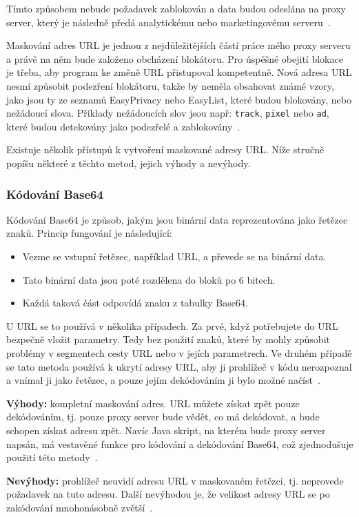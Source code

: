 Tímto způsobem nebude požadavek zablokován a data budou odeslána na proxy server, který je následně předá analytickému nebo marketingovému serveru~\cite{endpoint}.

\bigskip

Maskování adres URL je jednou z nejdůležitějších částí práce mého proxy serveru a právě na něm bude založeno obcházení blokátoru. Pro úspěšné obejití blokace je třeba, aby program ke změně URL přistupoval kompetentně. Nová adresa URL nesmí způsobit podezření blokátoru, takže by neměla obsahovat známé vzory, jako jsou ty ze seznamů EasyPrivacy nebo EasyList, které budou blokovány, nebo nežádoucí slova. Příklady nežádoucích slov jsou např: \texttt{track}, \texttt{pixel} nebo \texttt{ad}, které budou detekovány jako podezřelé a zablokovány~\cite{ad}. 

Existuje několik přístupů k vytvoření maskované adresy URL. Níže stručně popíšu některé z těchto metod, jejich výhody a nevýhody.

\subsubsection{Kódování Base64}
Kódování Base64 je způsob, jakým jsou binární data reprezentována jako řetězec znaků. Princip fungování je následující:
\bigskip
\begin{itemize}
  \item{Vezme se vstupní řetězec, například URL, a převede se na binární data.}
  \item{Tato binární data jsou poté rozdělena do bloků po 6 bitech.}
  \item{Každá taková část odpovídá znaku z tabulky Base64.}
\end{itemize}
U URL se to používá v několika případech. Za prvé, když potřebujete do URL bezpečně vložit parametry. Tedy bez použití znaků, které by mohly způsobit problémy v segmentech cesty URL nebo v jejích parametrech. Ve druhém případě se tato metoda používá k ukrytí adresy URL, aby ji prohlížeč v kódu nerozpoznal a vnímal ji jako řetězec, a pouze jejím dekódováním ji bylo možné načíst~\cite{base64}.

\textbf{Výhody:} kompletní maskování adres. URL můžete získat zpět pouze dekódováním, tj. pouze proxy server bude vědět, co má dekódovat, a bude schopen získat adresu zpět. Navíc Java skript, na kterém bude proxy server napsán, má vestavěné funkce pro kódování a dekódování Base64, což zjednodušuje použití této metody~\cite{base64Git}.

\textbf{Nevýhody:} prohlížeč neuvidí adresu URL v maskovaném řetězci, tj. neprovede požadavek na tuto adresu. Další nevýhodou je, že velikost adresy URL se po zakódování mnohonásobně zvětší~\cite{base64Len}.

